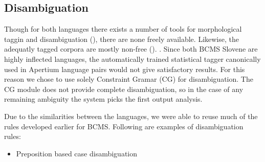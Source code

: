 \subsection{Disambiguation}
Though for both languages there exists a number of tools for
morphological taggin and disambiguation (), there
are none freely available. Likewise, the adequatly tagged corpora are
mostly non-free (). .  Since both BCMS Slovene are
highly inflected languages, the automatically trained statistical
tagger canonically used in Apertium language pairs would not give
satisfactory results. For this reason we chose to use solely
Constraint Gramar (CG) for disambiguation. The CG module does not
provide complete disambiguation, so in the case of any remaining
ambiguity the system picks the first output analysis.

Due to the similarities between the languages, we were able to
reuse much of the rules developed earlier for BCMS. Following are
examples of disambiguation rules:


\begin{itemize}
\item Preposition based case disambiguation


\end{itemize}

